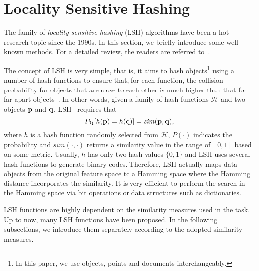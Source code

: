 \section{Locality Sensitive Hashing}
\label{background:lsh}

The family of \textit{locality sensitive hashing} (\mbox{LSH}) algorithms have been a hot research topic since the 1990s. In this section, we briefly introduce some well-known methods. For a detailed review, the readers are referred to~\cite{andoni2006focs}. 

The concept of \mbox{LSH} is very simple, that is, it aims to hash objects\footnote{In this paper, we use objects, points and documents interchangeably.} using a number of hash functions to ensure that, for each function, the collision probability for objects that are close to each other is much higher than that for far apart objects~\cite{indyk1998stoc}. In other words, given a family of hash functions $\mathcal{H}$ and two objects $ {\bf p} $ and $ {\bf q} $, \mbox{LSH}~\cite{charikar2002stoc} requires that 
$$ P_{\mathcal{H}}[h({\bf p})=h({\bf q})] = \mathit{sim}({\bf p}, {\bf q}),$$
where $ h $ is a hash function randomly selected from $\mathcal{H}$, $ P(\cdot) $ indicates the probability and $ \mathit{sim}(\cdot,\cdot) $ returns a similarity value in the range of $ [0,1] $ based on some metric. Usually, $ h $ has only two hash values $ \{0,1\} $ and \mbox{LSH} uses several hash functions to generate binary codes. Therefore, \mbox{LSH} actually maps data objects from the original feature space to a Hamming space where the Hamming distance incorporates the similarity. It is very efficient to perform the search in the Hamming space via bit operations or data structures such as dictionaries.

%

\mbox{LSH} functions are highly dependent on the similarity measures used in the task. Up to now, many \mbox{LSH} functions have been proposed. In the following subsections, we introduce them separately according to the adopted similarity measures.


